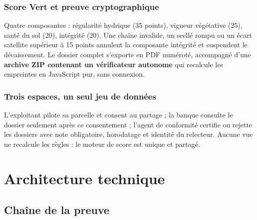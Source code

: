 \documentclass[12pt, a4paper]{article}
\begin{document}
\subsubsection{Score Vert et preuve cryptographique}

Quatre composantes : régularité hydrique (35 points), vigueur végétative (25), santé du sol
(20), intégrité (20). Une chaîne invalide, un scellé rompu ou un écart satellite supérieur
à 15 points annulent la composante intégrité et suspendent le décaissement. Le dossier
complet s'exporte en PDF numéroté, accompagné d'une \textbf{archive ZIP contenant un
vérificateur autonome} qui recalcule les empreintes en JavaScript pur, sans connexion.

\subsubsection{Trois espaces, un seul jeu de données}

L'exploitant pilote sa parcelle et consent au partage ; la banque consulte le dossier
seulement après ce consentement ; l'agent de conformité certifie ou rejette les dossiers
avec note obligatoire, horodatage et identité du relecteur. Aucune vue ne recalcule les
règles : le moteur de score est unique et partagé.

\newpage
\section{Architecture technique}

\subsection{Chaîne de la preuve}
\end{document}
